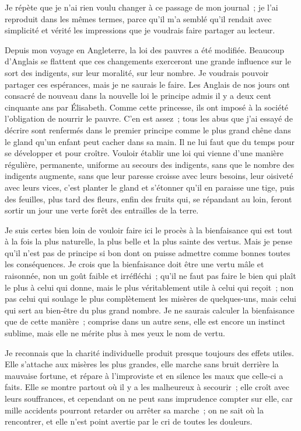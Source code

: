 \documentclass[french,twoside]{book} %
\begin{document}
\noindent Je répète que je n’ai rien voulu changer à ce passage de mon journal ; je l’ai reproduit dans les mêmes termes, parce qu’il m’a semblé qu’il rendait avec simplicité et vérité les impressions que je voudrais faire partager au lecteur.\par
Depuis mon voyage en Angleterre, la loi des pauvres a été modifiée. Beaucoup d’Anglais se flattent que ces changements exerceront une grande influence sur le sort des indigents, sur leur moralité, sur leur nombre. Je voudrais pouvoir partager ces espérances, mais je ne saurais le faire. Les Anglais de nos jours ont consacré de nouveau dans la nouvelle loi le principe admis il y a deux cent cinquante ans par Élisabeth. Comme cette princesse, ils ont imposé à la société l’obligation de nourrir le pauvre. C'en est assez ; tous les abus que j’ai essayé de décrire sont renfermés dans le premier principe comme le plus grand chêne dans le gland qu’un enfant peut cacher dans sa main. Il ne lui faut que du temps pour se développer et pour croître. Vouloir établir une loi qui vienne d’une manière régulière, permanente, uniforme au secours des indigents, sans que le nombre des indigents augmente, sans que leur paresse croisse avec leurs besoins, leur oisiveté avec leurs vices, c’est planter le gland et s’étonner qu’il en paraisse une tige, puis des feuilles, plus tard des fleurs, enfin des fruits qui, se répandant au loin, feront sortir un jour une verte forêt des entrailles de la terre.\par
\bigbreak
\noindent Je suis certes bien loin de vouloir faire ici le procès à la bienfaisance qui est tout à la fois la plus naturelle, la plus belle et la plus sainte des vertus. Mais je pense qu’il n’est pas de principe si bon dont on puisse admettre comme bonnes toutes les conséquences. Je crois que la bienfaisance doit être une vertu mâle et raisonnée, non un goût faible et irréfléchi ; qu’il ne faut pas faire le bien qui plaît le plus à celui qui donne, mais le plus véritablement utile à celui qui reçoit ; non pas celui qui soulage le plus complètement les misères de quelques-uns, mais celui qui sert au bien-être du plus grand nombre. Je ne saurais calculer la bienfaisance que de cette manière ; comprise dans un autre sens, elle est encore un instinct sublime, mais elle ne mérite plus à mes yeux le nom de vertu.\par
Je reconnais que la charité individuelle produit presque toujours des effets utiles. Elle s’attache aux misères les plus grandes, elle marche sans bruit derrière la mauvaise fortune, et répare à l’improviste et en silence les maux que celle-ci a faits. Elle se montre partout où il y a les malheureux à secourir ; elle croît avec leurs souffrances, et cependant on ne peut sans imprudence compter sur elle, car mille accidents pourront retarder ou arrêter sa marche ; on ne sait où la rencontrer, et elle n’est point avertie par le cri de toutes les douleurs.\par
\end{document}
